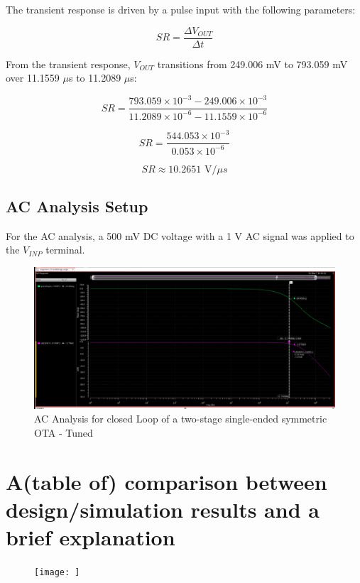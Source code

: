 The transient response is driven by a pulse input with the following parameters:

\begin{equation}
    SR = \frac{\Delta V_{OUT}}{\Delta t}
\end{equation}

From the transient response, $V_{OUT}$ transitions from 249.006 mV to 793.059 mV over 11.1559 $\mu$s to 11.2089 $\mu$s:

\begin{equation}
    SR = \frac{793.059 \times 10^{-3} - 249.006 \times 10^{-3}}{ 11.2089  \times 10^{-6} -  11.1559 \times 10^{-6}}
\end{equation}

\begin{equation}
    SR = \frac{544.053 \times 10^{-3}}{0.053 \times 10^{-6}}
\end{equation}

\begin{equation}
    SR \approx 10.2651 \text{ V/} \mu s
\end{equation}

\subsection{AC Analysis Setup}


For the AC analysis, a 500 mV DC voltage with a 1 V AC signal was applied to the $V_{INP}$ terminal.
    \begin{figure}[h]
        \centering
           \includegraphics[width=1\textwidth]{images/fine_tuned_close.png}
        \caption{AC Analysis for closed Loop of a two-stage single-ended symmetric OTA - Tuned }
        \label{fig: }
    \end{figure}






\section{ A(table of) comparison between design/simulation results and a brief explanation}





    \begin{figure}[h]
        \centering
           \texttt{[image: ]}
        \caption{}
        \label{fig: }
    \end{figure}

\endinput